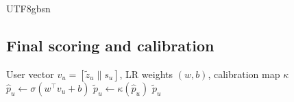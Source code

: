 \documentclass[acmsmall,natbib]{acmart}
\begin{document}
\begin{CJK*}{UTF8}{gbsn}
\subsection{Final scoring and calibration}
\begin{algorithm}[h]
\caption{User-level scoring and isotonic calibration}
\label{alg:score}
\begin{algorithmic}[1]
\Require User vector $v_u=[\tilde{z}_u \| s_u]$, LR weights $(w,b)$, calibration map $\kappa$
\State $\hat{p}_u \gets \sigma(w^\top v_u + b)$
\State $\tilde{p}_u \gets \kappa(\hat{p}_u)$
\State \Return $\tilde{p}_u$
\end{algorithmic}
\end{algorithm}


\end{CJK*}
\end{document}
